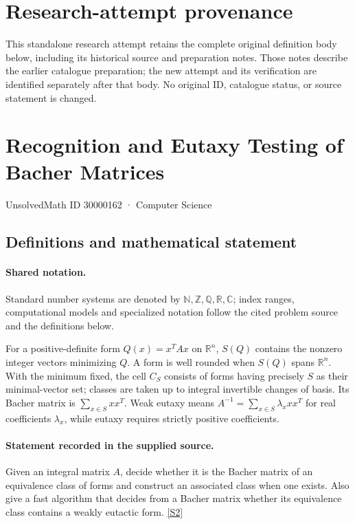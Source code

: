 \documentclass[11pt]{article}
\begin{document}
\section*{Research-attempt provenance}
This standalone research attempt retains the complete original definition body below,
including its historical source and preparation notes. Those notes describe the
earlier catalogue preparation; the new attempt and its verification are identified
separately after that body. No original ID, catalogue status, or source statement is changed.

\section{Recognition and Eutaxy Testing of Bacher Matrices}\label{30000162}
{\small UnsolvedMath ID 30000162 · Computer Science}
\subsection{Definitions and mathematical statement}

\paragraph{Shared notation.}Standard number systems are denoted by $\mathbb N,\mathbb Z,\mathbb Q,\mathbb R,\mathbb C$; index ranges, computational models and specialized notation follow the cited problem source and the definitions below.


For a positive-definite form $Q(x)=x^TAx$ on $\mathbb R^n$, $S(Q)$ contains the nonzero integer vectors minimizing $Q$. A form is well rounded when $S(Q)$ spans $\mathbb R^n$. With the minimum fixed, the cell $C_S$ consists of forms having precisely $S$ as their minimal-vector set; classes are taken up to integral invertible changes of basis. Its Bacher matrix is $\sum_{x\in S}xx^T$. Weak eutaxy means $A^{-1}=\sum_{x\in S}\lambda_xxx^T$ for real coefficients $\lambda_x$, while eutaxy requires strictly positive coefficients.
\paragraph{Statement recorded in the supplied source.}
Given an integral matrix $A$, decide whether it is the Bacher matrix of an equivalence class of forms and construct an associated class when one exists. Also give a fast algorithm that decides from a Bacher matrix whether its equivalence class contains a weakly eutactic form. \href{https://doi.org/10.4171/owr/2005/01}{[S2]}
\end{document}
